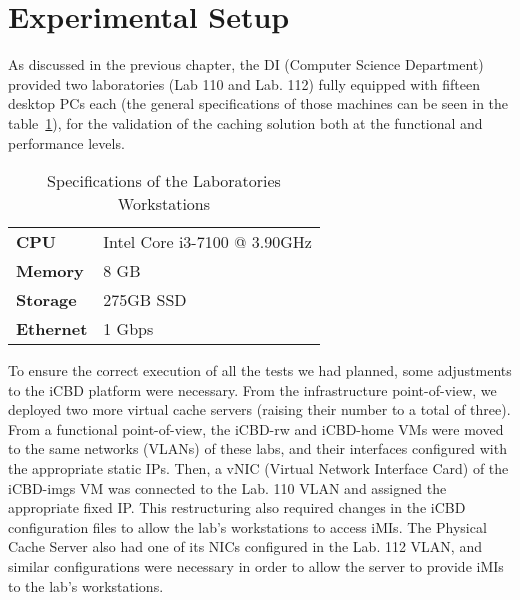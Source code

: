 



\section{Experimental Setup}
\label{sec:eval_exp_setup}

As discussed in the previous chapter, the DI (Computer Science Department) provided two laboratories (Lab 110 and Lab. 112) fully equipped with fifteen desktop PCs each (the general specifications of those machines can be seen in the table~\ref{tab:exp_lab_work}), for the validation of the caching solution both at the functional and performance levels.

\begin{table}[]
\centering
\begin{tabular}{ll}
\textbf{CPU} & Intel Core i3-7100 @ 3.90GHz \\
\textbf{Memory} & 8 GB \\
\textbf{Storage} & 275GB SSD \\
\textbf{Ethernet} & 1 Gbps
\end{tabular}
\caption{Specifications of the Laboratories Workstations}
\label{tab:exp_lab_work}
\end{table}


To ensure the correct execution of all the tests we had planned, some adjustments to the iCBD platform were necessary. From the infrastructure point-of-view, we deployed two more virtual cache servers (raising their number to a total of three).
From a functional point-of-view, the iCBD-rw and iCBD-home VMs were moved to the same networks (VLANs) of these labs, and their interfaces configured with the appropriate static IPs. Then, a vNIC (Virtual Network Interface Card) of the iCBD-imgs VM was connected to the Lab. 110 VLAN and assigned the appropriate fixed IP. This restructuring also required changes in the iCBD configuration files to allow the lab’s workstations to access iMIs. The Physical Cache Server also had one of its NICs configured in the Lab. 112 VLAN, and similar configurations were necessary in order to allow the server to provide iMIs to the lab’s workstations.


